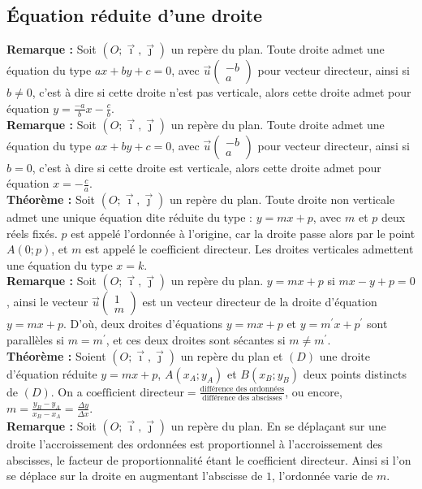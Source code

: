 \documentclass[a4paper,titlepage]{article}
\begin{document}
    \subsection{Équation réduite d'une droite}
        \textbf{Remarque :} Soit $\left(O;\vec{\imath},\vec{\jmath}\right)$ un repère du plan. Toute droite admet une équation du type $ax+by+c=0$, avec $\vec{u}\left(\begin{smallmatrix}-b\\a\end{smallmatrix}\right)$ pour vecteur directeur, ainsi si $b\neq0$, c’est à dire si cette droite n’est pas verticale, alors cette droite admet pour équation $y=\frac{-a}{b}x-\frac{c}{b}$.
        \\
        \textbf{Remarque :} Soit $\left(O;\vec{\imath},\vec{\jmath}\right)$ un repère du plan. Toute droite admet une équation du type $ax+by+c=0$, avec $\vec{u}\left(\begin{smallmatrix}-b\\a\end{smallmatrix}\right)$ pour vecteur directeur, ainsi si $b=0$, c’est à dire si cette droite est verticale, alors cette droite admet pour équation $x=-\frac{c}{a}$.
        \\
        \textbf{Théorème :} Soit $\left(O;\vec{\imath},\vec{\jmath}\right)$ un repère du plan. Toute droite non verticale admet une unique équation dite réduite du type : $y=mx+p$, avec $m$ et $p$ deux réels fixés. $p$ est appelé l’ordonnée à l’origine, car la droite passe alors par le point $A\left(0;p\right)$, et $m$ est appelé le coefficient directeur. Les droites verticales admettent une équation du type $x=k$.
        \\
        \textbf{Remarque :} Soit $\left(O;\vec{\imath},\vec{\jmath}\right)$ un repère du plan. $y=mx+p$ si $mx-y+p=0$, ainsi le vecteur $\vec{u}\left(\begin{smallmatrix}1\\m\end{smallmatrix}\right)$ est un vecteur directeur de la droite d’équation $y=mx+p$. D’où, deux droites d’équations $y=mx+p$ et $y=m^{\prime}x+p^{\prime}$ sont parallèles si $m=m^{\prime}$, et ces deux droites sont sécantes si $m\neq m^{\prime}$.
        \\
        \textbf{Théorème :} Soient $\left(O;\vec{\imath},\vec{\jmath}\right)$ un repère du plan et $\left(D\right)$ une droite d'équation réduite $y=mx+p$, $A\left(x_{A};y_{A}\right)$ et $B\left(x_{B};y_{B}\right)$ deux points distincts de $\left(D\right)$. On a $\text{coefficient directeur}=\frac{\text{différence des ordonnées}}{\text{différence des abscisses}}$, ou encore, $m=\frac{y_{B}-y_{A}}{x_{B}-x_{A}}=\frac{\varDelta y}{\varDelta x}$.
        \\
        \textbf{Remarque :} Soit $\left(O;\vec{\imath},\vec{\jmath}\right)$ un repère du plan. En se déplaçant sur une droite l’accroissement des ordonnées est proportionnel à l’accroissement des abscisses, le facteur de proportionnalité étant le coefficient directeur. Ainsi si l’on se déplace sur la droite en augmentant l’abscisse de $1$, l’ordonnée varie de $m$.
\end{document}
